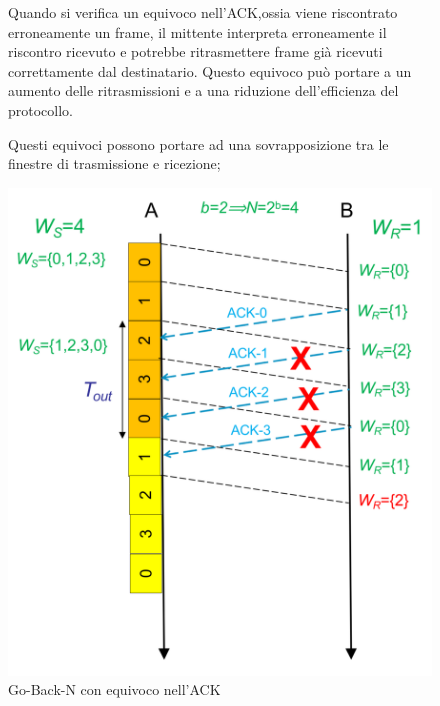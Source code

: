\begin{figure}[htbp]
    \centering
    \begin{minipage}{0.5\textwidth}
        Quando si verifica un equivoco nell'ACK,ossia viene riscontrato erroneamente un frame,  il mittente interpreta erroneamente il riscontro ricevuto e potrebbe ritrasmettere frame già ricevuti correttamente dal destinatario. 
        Questo equivoco può portare a un aumento delle ritrasmissioni e a una riduzione dell'efficienza del protocollo.

        Questi equivoci possono portare ad una sovrapposizione tra le finestre di trasmissione e ricezione; 
    \end{minipage}%
    \hfill
    \begin{minipage}{0.45\textwidth}
        \includegraphics[width=\linewidth]{images/equivocoack.png}
        \caption{Go-Back-N con equivoco nell'ACK}
    \end{minipage}
\end{figure}


